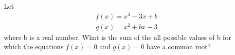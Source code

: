 \item Let
\begin{align*}
f(x) = x^3 - 3x + b
\end{align*}
\begin{align*}
g(x) = x^2 + bx - 3
\end{align*}
where b is a real number. What is the sum of the all possible values of b for which the equations $f(x) = 0$ and $g(x) = 0$ have a common root?
























































































